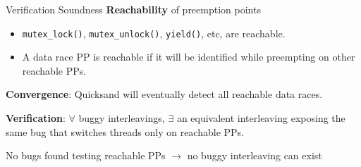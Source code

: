 \documentclass[xcolor=dvipsnames]{beamer}
\begin{document}
\begin{frame}{Verification Soundness}
	\textbf{Reachability} of preemption points
	\begin{itemize}
		\item {\tt mutex\_lock()}, {\tt mutex\_unlock()}, {\tt yield()}, etc, are reachable.
		\item A data race PP is reachable if it will be identified while preempting on other reachable PPs.
	\end{itemize}
	\linegap

	{\bf Convergence}: Quicksand will eventually detect all reachable data races.
	\linegap

	{\bf Verification}: $\forall$ buggy interleavings, $\exists$ an equivalent interleaving exposing the same bug
	that switches threads only on reachable PPs.
	\linegap

	No bugs found testing reachable PPs $\rightarrow$ no buggy interleaving can exist
\end{frame}
\end{document}
